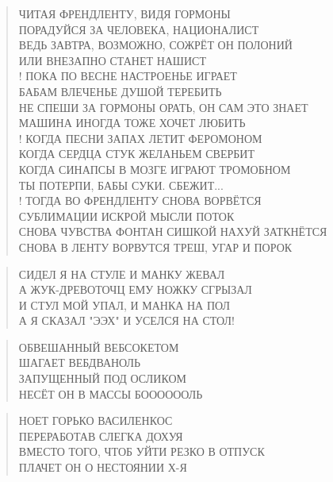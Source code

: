 \poemtitle{***}
\begin{verse}
ЧИТАЯ ФРЕНДЛЕНТУ, ВИДЯ ГОРМОНЫ\\
ПОРАДУЙСЯ ЗА ЧЕЛОВЕКА, НАЦИОНАЛИСТ\\
ВЕДЬ ЗАВТРА, ВОЗМОЖНО, СОЖРЁТ ОН ПОЛОНИЙ\\
ИЛИ ВНЕЗАПНО СТАНЕТ НАШИСТ\\!
ПОКА ПО ВЕСНЕ НАСТРОЕНЬЕ ИГРАЕТ\\
БАБАМ ВЛЕЧЕНЬЕ ДУШОЙ ТЕРЕБИТЬ\\
НЕ СПЕШИ ЗА ГОРМОНЫ ОРАТЬ, ОН САМ ЭТО ЗНАЕТ\\
МАШИНА ИНОГДА ТОЖЕ ХОЧЕТ ЛЮБИТЬ\\!
КОГДА ПЕСНИ ЗАПАХ ЛЕТИТ ФЕРОМОНОМ\\
КОГДА СЕРДЦА СТУК ЖЕЛАНЬЕМ СВЕРБИТ\\
КОГДА СИНАПСЫ В МОЗГЕ ИГРАЮТ ТРОМОБНОМ\\
ТЫ ПОТЕРПИ, БАБЫ СУКИ. СБЕЖИТ...\\!
ТОГДА ВО ФРЕНДЛЕНТУ СНОВА ВОРВЁТСЯ\\
СУБЛИМАЦИИ ИСКРОЙ МЫСЛИ ПОТОК\\
СНОВА ЧУВСТВА ФОНТАН СИШКОЙ НАХУЙ ЗАТКНЁТСЯ\\
СНОВА В ЛЕНТУ ВОРВУТСЯ ТРЕШ, УГАР И ПОРОК
\end{verse}

\poemtitle{***}
\begin{verse}
СИДЕЛ Я НА СТУЛЕ И МАНКУ ЖЕВАЛ\\
А ЖУК-ДРЕВОТОЧЦ ЕМУ НОЖКУ СГРЫЗАЛ\\
И СТУЛ МОЙ УПАЛ, И МАНКА НА ПОЛ\\
А Я СКАЗАЛ "ЭЭХ" И УСЕЛСЯ НА СТОЛ!
\end{verse}

\poemtitle{***}
\begin{verse}
ОБВЕШАННЫЙ ВЕБСОКЕТОМ\\
ШАГАЕТ ВЕБДВАНОЛЬ\\
ЗАПУЩЕННЫЙ ПОД ОСЛИКОМ\\
НЕСЁТ ОН В МАССЫ БООООООЛЬ
\end{verse}

\poemtitle{***}
\begin{verse}
НОЕТ ГОРЬКО ВАСИЛЕНКОС\\
ПЕРЕРАБОТАВ СЛЕГКА ДОХУЯ\\
ВМЕСТО ТОГО, ЧТОБ УЙТИ РЕЗКО В ОТПУСК\\
ПЛАЧЕТ ОН О НЕСТОЯНИИ Х-Я
\end{verse}


